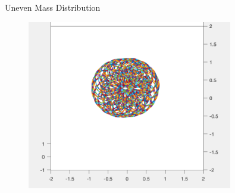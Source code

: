 \documentclass[10pt]{beamer}
\begin{document}
\begin{frame} {Uneven Mass Distribution}
    \begin{figure}
	\begin{minipage}{0.48\textwidth}
		\centering
		\includegraphics[width=0.8\textwidth]{trace_half.png}
	\end{minipage}
    \end{figure}
\end{frame}
\end{document}
